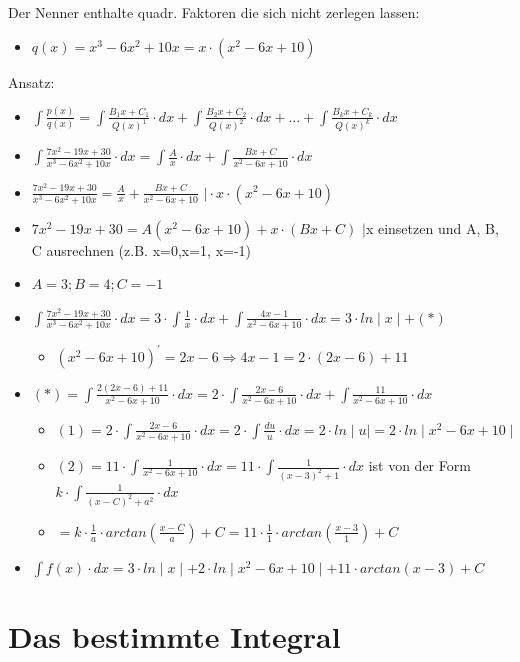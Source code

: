 Der Nenner enthalte quadr. Faktoren die sich nicht zerlegen lassen:
\begin{itemize}
\item $q(x)=x^{3}-6x^{2}+10x=x\cdot(x^{2}-6x+10)$
\end{itemize}
Ansatz:
\begin{itemize}
\item $\int\frac{p(x)}{q(x)}=\int\frac{B_{1}x+C_{1}}{Q(x)^{1}}\cdot dx+\int\frac{B_{2}x+C_{2}}{Q(x)^{2}}\cdot dx+...+\int\frac{B_{k}x+C_{k}}{Q(x)^{k}}\cdot dx$
\item $\int\frac{7x^{2}-19x+30}{x^{3}-6x^{2}+10x}\cdot dx=\int\frac{A}{x}\cdot dx+\int\frac{Bx+C}{x^{2}-6x+10}\cdot dx$
\item $\frac{7x^{2}-19x+30}{x^{3}-6x^{2}+10x}=\frac{A}{x}+\frac{Bx+C}{x^{2}-6x+10}$
$\mid\cdot x\cdot(x^{2}-6x+10)$
\item $7x^{2}-19x+30=A(x^{2}-6x+10)+x\cdot(Bx+C)$ $\mid$x einsetzen und
A, B, C ausrechnen (z.B. x=0,x=1, x=-1)
\item $A=3;B=4;C=-1$
\item $\int\frac{7x^{2}-19x+30}{x^{3}-6x^{2}+10x}\cdot dx=3\cdot\int\frac{1}{x}\cdot dx+\int\frac{4x-1}{x^{2}-6x+10}\cdot dx=3\cdot ln\mid x\mid+(*)$

\begin{itemize}
\item $(x^{2}-6x+10)^{\prime}=2x-6\Rightarrow4x-1=2\cdot(2x-6)+11$
\end{itemize}
\item $(*)=\int\frac{2(2x-6)+11}{x^{2}-6x+10}\cdot dx=2\cdot\int\frac{2x-6}{x^{2}-6x+10}\cdot dx+\int\frac{11}{x^{2}-6x+10}\cdot dx$

\begin{itemize}
\item $(1)=2\cdot\int\frac{2x-6}{x^{2}-6x+10}\cdot dx=2\cdot\int\frac{du}{u}\cdot dx=2\cdot ln\mid u\mid=2\cdot ln\mid x^{2}-6x+10\mid$
\item $(2)=11\cdot\int\frac{1}{x^{2}-6x+10}\cdot dx=11\cdot\int\frac{1}{(x-3)^{2}+1}\cdot dx$
ist von der Form $k\cdot\int\frac{1}{(x-C)^{2}+a^{2}}\cdot dx$
\item $=k\cdot\frac{1}{a}\cdot arctan(\frac{x-C}{a})+C=11\cdot\frac{1}{1}\cdot arctan(\frac{x-3}{1})+C$
\end{itemize}
\item $\int f(x)\cdot dx=3\cdot ln\mid x\mid+2\cdot ln\mid x^{2}-6x+10\mid+11\cdot arctan(x-3)+C$
\end{itemize}

\section*{Das bestimmte Integral}


